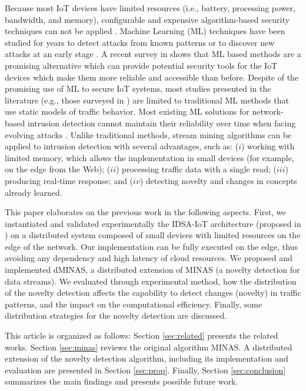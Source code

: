 Because most IoT devices have limited resources (i.e., battery, processing power, bandwidth, and memory),  configurable and expensive algorithm-based security techniques can not be applied \cite{Zhou2017}.
Machine Learning (ML) techniques have been studied for years to detect attacks from known patterns or to discover new attacks at an early stage  \cite{buczak2016survey,mitchell2014survey}.
A recent survey in  \cite{Tahsien2020} shows that ML based methods are a promising alternative which can provide potential security tools for the IoT devices which make them more reliable and accessible than before. 
Despite of the promising use of ML to secure IoT systems, most studies presented in the literature (e.g., those surveyed in \cite{buczak2016survey,mitchell2014survey,Tahsien2020}) are limited to traditional ML methods that use static models of traffic behavior. 
Most existing ML solutions for network-based intrusion detection cannot maintain their reliability over time when facing evolving attacks \cite{Viegas2019}.
Unlike traditional methods, stream mining algorithms can be applied to intrusion detection with several advantages, such as: ($ i $) working with limited memory, which allows the implementation in small devices (for example, on the edge from the Web); ($ ii $) processing traffic data with a single read; ($ iii $) producing real-time response; and ($ iv $) detecting novelty and changes in concepts already learned.

{\color{red} This paper elaborates on the previous work in the following aspects. First, we instantiated and validated experimentally the IDSA-IoT architecture (proposed in \cite{Cassales2019a} ) on a distributed system composed of small devices with limited resources on the edge of the network. Our implementation can be fully executed on the edge, thus avoiding any dependency and high latency of cloud resources. We proposed and implemented dMINAS, a distributed extension of MINAS \cite{Faria2016minas} (a novelty detection for data streams). We evaluated through experimental method, how the distribution of the novelty detection affects the capability to detect changes (novelty) in traffic patterns, and the impact on the computational efficiency. Finally, some distribution strategies for the novelty detection are discussed. }

This article is organized as follows: Section \ref{sec:related} presents the related works. Section \ref{sec:minas} reviews the original algorithm MINAS. A distributed extension of the novelty detection algorithm, including its implementation and evaluation are presented in Section \ref{sec:prop}. Finally, Section \ref{sec:conclusion} summarizes the main findings and presents possible future work.


